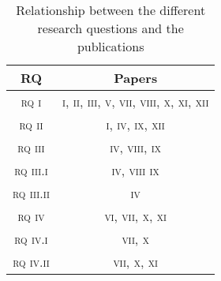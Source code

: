\begin{table}[h]
\centering
\caption{Relationship between the different research questions and the publications}\label{table:RQPapers}
\begin{tabular}{|c|c|}
\hline
\rule{0pt}{12pt}
RQ&Papers\\ \hline
\textsc{rq i} & \textsc{i, ii, iii, v, vii, viii, x, xi, xii}\\
\hline
\textsc{rq ii} & \textsc{i, iv, ix, xii}\\ \hline
\textsc{rq iii} & \textsc{iv, viii, ix}\\ %
\textsc{rq iii.i} & \textsc{iv, viii ix}\\ %
\textsc{rq iii.ii} & \textsc{iv}\\ \hline

\textsc{rq iv} & \textsc{vi, vii, x, xi}\\ %
\textsc{rq iv.i} & \textsc{vii, x}\\ %
\textsc{rq iv.ii} & \textsc{vii, x, xi}\\ \hline

\end{tabular}
\end{table}
\bigskip




